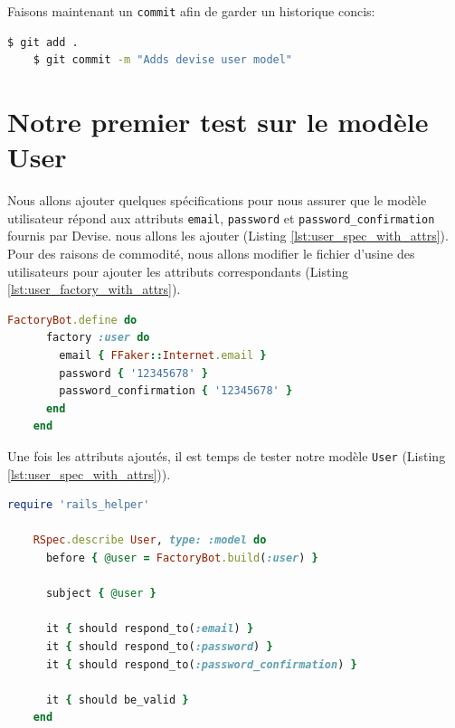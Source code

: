 \documentclass[]{report}
\begin{document}
    Faisons maintenant un \verb|commit| afin de garder un historique concis:

    \begin{scriptsize}
    \begin{lstlisting}[language=bash]
    $ git add .
    $ git commit -m "Adds devise user model"
    \end{lstlisting}
    \end{scriptsize}

  \section{Notre premier test sur le modèle User}

    Nous allons ajouter quelques spécifications pour nous assurer que le modèle utilisateur répond aux attributs \verb|email|, \verb|password| et \verb|password_confirmation| fournis par Devise. nous allons les ajouter (Listing \ref{lst:user_spec_with_attrs}). Pour des raisons de commodité, nous allons modifier le fichier d'usine des utilisateurs pour ajouter les attributs correspondants (Listing \ref{lst:user_factory_with_attrs}).

    \begin{scriptsize}
    \begin{lstlisting}[language=ruby, caption={Usine d'utilisateurs avec les attributs (spec/factories/users.rb)}, label={lst:user_factory_with_attrs}]
    FactoryBot.define do
      factory :user do
        email { FFaker::Internet.email }
        password { '12345678' }
        password_confirmation { '12345678' }
      end
    end
    \end{lstlisting}
    \end{scriptsize}

    Une fois les attributs ajoutés, il est temps de tester notre modèle \verb|User| (Listing \ref{lst:user_spec_with_attrs})).

    \begin{scriptsize}
    \begin{lstlisting}[language=ruby, caption={Test pour les attributs Devise (spec/models/user\_spec.rb)}, label={lst:user_spec_with_attrs}]
    require 'rails_helper'

    RSpec.describe User, type: :model do
      before { @user = FactoryBot.build(:user) }

      subject { @user }

      it { should respond_to(:email) }
      it { should respond_to(:password) }
      it { should respond_to(:password_confirmation) }

      it { should be_valid }
    end
    \end{lstlisting}
    \end{scriptsize}
\end{document}
